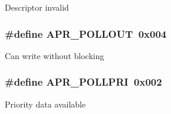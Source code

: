 Descriptor invalid \hypertarget{group__pollopts_ga6fb703db1d11e2c5f66d8c6146e56053}{
\subsubsection[{A\-P\-R\-\_\-\-P\-O\-L\-L\-O\-U\-T}]{\setlength{\rightskip}{0pt plus 5cm}\#define A\-P\-R\-\_\-\-P\-O\-L\-L\-O\-U\-T~0x004}}\label{group__pollopts_ga6fb703db1d11e2c5f66d8c6146e56053}
Can write without blocking \hypertarget{group__pollopts_ga196c38e1914077c4c9a0cf3ce87f1b9c}{
\subsubsection[{A\-P\-R\-\_\-\-P\-O\-L\-L\-P\-R\-I}]{\setlength{\rightskip}{0pt plus 5cm}\#define A\-P\-R\-\_\-\-P\-O\-L\-L\-P\-R\-I~0x002}}\label{group__pollopts_ga196c38e1914077c4c9a0cf3ce87f1b9c}
Priority data available 